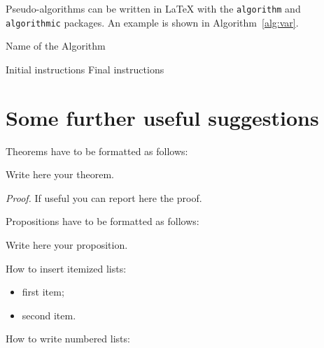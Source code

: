 \documentclass[11pt,a4paper]{article}
\begin{document}
        Pseudo-algorithms can be written in \LaTeX{} with the \texttt{algorithm} and \texttt{algorithmic} packages. An example is shown in Algorithm~\ref{alg:var}.

        \begin{algorithm}[H]
            \label{alg:example}
            \caption{Name of the Algorithm}
            \label{alg:var}
            \label{protocol1}
            \begin{algorithmic}[1]
                \STATE Initial instructions
                    \ENDIF
                \ENDFOR
                \ENDWHILE
                \STATE Final instructions
            \end{algorithmic}
        \end{algorithm} 

\section{Some further useful suggestions}

    Theorems have to be formatted as follows:

    \begin{theorem} \label{a_theorem}
        Write here your theorem. 
    \end{theorem}
    \textit{Proof.} If useful you can report here the proof.
    \vspace{0.3cm} %

    Propositions have to be formatted as follows:

    \begin{proposition}
        Write here your proposition.
    \end{proposition}
    \vspace{0.3cm} %

    How to insert itemized lists:

    \begin{itemize}
        \item first item;
        \item second item.
    \end{itemize}

    How to write numbered lists:
\end{document}
